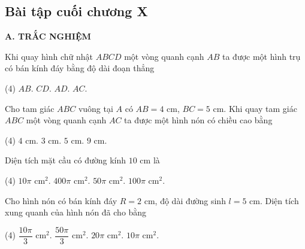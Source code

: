 \begin{exercises}
    \subsection{Bài tập cuối chương X}

    \textbf{A. TRẮC NGHIỆM}

    \begin{questions}[resume=SGK]
        \item Khi quay hình chữ nhật $ABCD$ một vòng quanh cạnh $AB$ ta được một hình trụ có bán kính đáy bằng độ dài đoạn thẳng
        \begin{tasks}(4)
            \task $AB$.
            \task $CD$.
            \task $AD$.
            \task $AC$.
        \end{tasks}
        \par\noindent\answerbox\par

        \item Cho tam giác $ABC$ vuông tại $A$ có $AB=4$ cm, $BC=5$ cm. Khi quay tam giác $ABC$ một vòng quanh cạnh $AC$ ta được một hình nón có chiều cao bằng
        \begin{tasks}(4)
            \task $4$ cm.
            \task $3$ cm.
            \task $5$ cm.
            \task $9$ cm.
        \end{tasks}
        \par\noindent\answerbox\par

        \item Diện tích mặt cầu có đường kính $10$ cm là
        \begin{tasks}(4)
            \task $10\pi$ cm$^2$.
            \task $400\pi$ cm$^2$.
            \task $50\pi$ cm$^2$.
            \task $100\pi$ cm$^2$.
        \end{tasks}
        \par\noindent\answerbox\par

        \item Cho hình nón có bán kính đáy $R=2$ cm, độ dài đường sinh $l=5$ cm. Diện tích xung quanh của hình nón đã cho bằng
        \begin{tasks}(4)
            \task $\dfrac{10\pi}{3}$ cm$^2$.
            \task $\dfrac{50\pi}{3}$ cm$^2$.
            \task $20\pi$ cm$^2$.
            \task $10\pi$ cm$^2$.
        \end{tasks}
        \par\noindent\answerbox\par


\end{questions}
\end{exercises}

